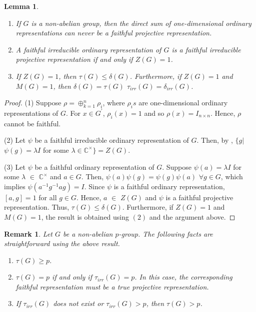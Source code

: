 \documentclass[a4paper,11pt]{amsart}
\numberwithin{equation}{section}
\numberwithin{equation}{subsection}
\newtheorem{lemma}[theorem]{Lemma}
\newtheorem{remark}[theorem]{Remark}
\newcommand{\dg}{\delta(G)}
\newcommand{\tg}{\tau(G)}
\newcommand{\ti}{\tau_{irr}(G)}
\begin{document}
	\begin{lemma} \label{one dim direct sum in non-abelian group}
		\begin{enumerate}
			\item If $G$ is a non-abelian group, then the direct sum of one-dimensional ordinary representations can never be a faithful projective representation.
			
			\item A faithful irreducible ordinary representation of $G$ is a faithful irreducible projective representation if and only if $Z(G)=1$.
			
			\item If $Z(G) = 1$, then $\tg \leq \dg $.
			Furthermore, if $Z(G) = 1$ and $M(G)=1$, then $\dg=\tg$    $\ti = \delta_{irr}(G)$.
		\end{enumerate}
		
	\end{lemma}
	
	\begin{proof}
		(1) Suppose $\rho= \oplus_{k=1}^{n}\rho_{i}$, where $\rho_{i}s$ are one-dimensional ordinary representations of $G$.
		For $x \in G^\prime$, $\rho_{i}(x)=1$ and so
		$\rho(x)= I_{n \times n}$. Hence, $\rho$ cannot be faithful.
		
		(2) Let $\psi$ be a faithful irreducible ordinary representation of $G$. Then, by \cite[Chapter 2, Lemma 2.27, (f)]{isaacs}, $\{g$$|$$\psi(g)=\lambda I$ for some $\lambda\in \mathbb{C}^{\times} \} =Z(G)$.
		
		(3) Let $\psi$ be a faithful ordinary representation of $G$. Suppose $\psi(a)= \lambda I$ for some $\lambda$ $\in$ $\mathbb{C}^{\times}$ and $a \in G$. Then, $\psi(a)\psi(g)= \psi(g) \psi(a)$ $\forall g \in G$, which implies $\psi(a^{-1}g^{-1}ag)=I$. Since $\psi$ is a faithful ordinary representation, $[a,g]=1$ for all $g\in G$. 
		Hence, $a$ $\in$ $Z(G)$ and $\psi$ is a faithful projective representation. Thus, $\tg \leq \dg $. Furthermore, if $Z(G) = 1$ and $M(G)=1$, the result is obtained using $(2)$ and the argument above. 
		
	\end{proof}
	
	\begin{remark} \label{some results on p-groups} Let $G$ be a non-abelian $p$-group.
		The following facts are straightforward using the above result.
		\begin{enumerate}
			\item[(i)] $\tau(G) \geq p$.
			
			\item[(ii)] $\tau(G)=p$ if and only if $\tau_{irr}(G) =p$. In this case, the corresponding faithful representation must be a true projective representation.
			
			\item[(iii)] If $\tau_{irr}(G)$ does not exist or $\tau_{irr}(G)>p$, then $\tau(G) > p$.
		\end{enumerate}
	\end{remark}
	
\end{document}
